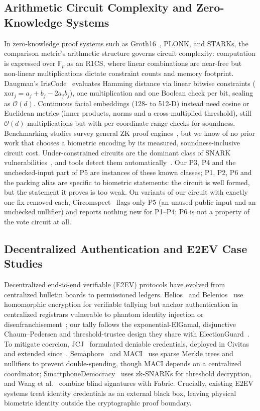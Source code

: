\documentclass[10pt,letterpaper,journal]{IEEEtran}
\begin{document}
\subsection{Arithmetic Circuit Complexity and Zero-Knowledge Systems}
\label{subsec:rel_circuit}
In zero-knowledge proof systems such as Groth16~\cite{Groth2016}, PLONK, and STARKs, the comparison metric's arithmetic structure governs circuit complexity: computation is expressed over $\mathbb{F}_p$ as an R1CS, where linear combinations are near-free but non-linear multiplications dictate constraint counts and memory footprint.
Daugman's IrisCode~\cite{Daugman2004,Daugman2016} evaluates Hamming distance via linear bitwise constraints ($\text{xor}_j = a_j + b_j - 2a_j b_j$), one multiplication and one Boolean check per bit, scaling as $\mathcal{O}(d)$. Continuous facial embeddings (128- to 512-D) instead need cosine or Euclidean metrics (inner products, norms and a cross-multiplied threshold), still $\mathcal{O}(d)$ multiplications but with per-coordinate range checks for soundness. Benchmarking studies survey general ZK proof engines~\cite{OudeRoelink2024}, but we know of no prior work that chooses a biometric encoding by its measured, soundness-inclusive circuit cost.
Under-constrained circuits are the dominant class of SNARK vulnerabilities~\cite{Chaliasos2024SoK}, and tools detect them automatically~\cite{Pailoor2023,Wen2024ZKAP}. Our P3, P4 and the unchecked-input part of P5 are instances of these known classes; P1, P2, P6 and the packing alias are specific to biometric statements: the circuit is well formed, but the statement it proves is too weak. On variants of our circuit with exactly one fix removed each, Circomspect~\cite{Circomspect} flags only P5 (an unused public input and an unchecked nullifier) and reports nothing new for P1--P4; P6 is not a property of the vote circuit at all.

\subsection{Decentralized Authentication and E2EV Case Studies}
\label{subsec:rel_e2ev}
Decentralized end-to-end verifiable (E2EV) protocols have evolved from centralized bulletin boards to permissioned ledgers. Helios~\cite{Adida2008} and Belenios~\cite{Cortier2019} use homomorphic encryption for verifiable tallying but anchor authentication in centralized registrars vulnerable to phantom identity injection or disenfranchisement~\cite{Jones2012,NASEM2018}; our tally follows the exponential-ElGamal, disjunctive Chaum--Pedersen and threshold-trustee design they share with ElectionGuard~\cite{Benaloh2024ElectionGuard}. To mitigate coercion, JCJ~\cite{Juels2005} formulated deniable credentials, deployed in Civitas~\cite{Civitas2008} and extended since~\cite{eprint2023_1578,Kho2025}. Semaphore~\cite{Gurkan2020} and MACI~\cite{Buterin2020} use sparse Merkle trees and nullifiers to prevent double-spending, though MACI depends on a centralized coordinator; SmartphoneDemocracy~\cite{Jozwik2025} uses zk-SNARKs for threshold decryption, and Wang et al.~\cite{Wang2024} combine blind signatures with Fabric. Crucially, existing E2EV systems treat identity credentials as an external black box, leaving physical biometric identity outside the cryptographic proof boundary.
\end{document}
